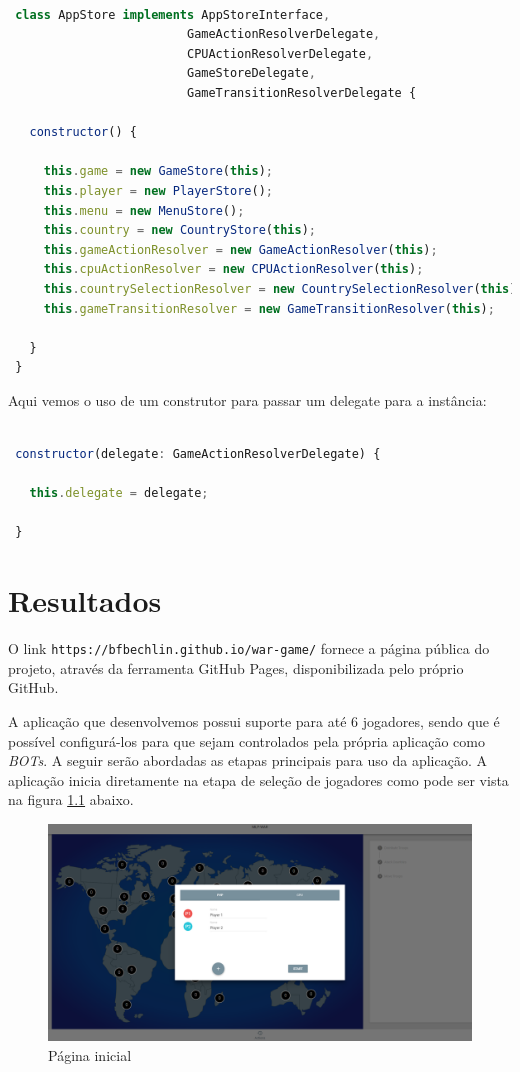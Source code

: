 \documentclass[rel_mlp]{iiufrgs}
\begin{document}
\begin{lstlisting}[language=JavaScript]

 class AppStore implements AppStoreInterface,
                         GameActionResolverDelegate,
                         CPUActionResolverDelegate,
                         GameStoreDelegate,
                         GameTransitionResolverDelegate {

   constructor() {

     this.game = new GameStore(this);
     this.player = new PlayerStore();
     this.menu = new MenuStore();
     this.country = new CountryStore(this);
     this.gameActionResolver = new GameActionResolver(this);
     this.cpuActionResolver = new CPUActionResolver(this);
     this.countrySelectionResolver = new CountrySelectionResolver(this);
     this.gameTransitionResolver = new GameTransitionResolver(this);

   }
 }
 \end{lstlisting}

Aqui vemos o uso de um construtor para passar um delegate para a instância:

\begin{lstlisting}[language=JavaScript]

 constructor(delegate: GameActionResolverDelegate) {

   this.delegate = delegate;

 }

\end{lstlisting}

\chapter{Resultados}

O link \texttt{https://bfbechlin.github.io/war-game/} fornece a página pública do projeto, através da ferramenta GitHub Pages, disponibilizada pelo próprio GitHub.

A aplicação que desenvolvemos possui suporte para até 6 jogadores, sendo que é possível configurá-los para que sejam controlados pela própria aplicação como \textit{BOTs}.
A seguir serão abordadas as etapas principais para uso da aplicação.
A aplicação inicia diretamente na etapa de seleção de jogadores como pode ser vista na figura \ref{fig:landing} abaixo.

\begin{figure}[h!]
\centering
  \includegraphics[width=1.0\textwidth]{images/landing.png}
  \caption{Página inicial}
  \label{fig:landing}
\end{figure}
\end{document}
